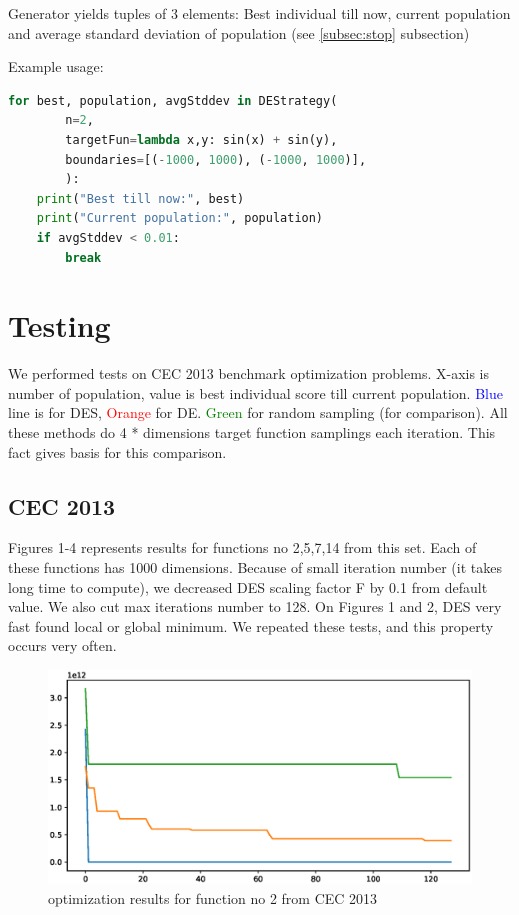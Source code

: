 \documentclass[11pt,a4paper]{article}
\begin{document}
Generator yields tuples of 3 elements:
Best individual till now, current population and average standard deviation of population (see \ref{subsec:stop} subsection)

Example usage:
\begin{lstlisting}[language=Python]
for best, population, avgStddev in DEStrategy(
        n=2,
        targetFun=lambda x,y: sin(x) + sin(y),
        boundaries=[(-1000, 1000), (-1000, 1000)],
        ):
    print("Best till now:", best)
    print("Current population:", population)
    if avgStddev < 0.01:
        break
\end{lstlisting}


\section{Testing}\label{sec:testing}
We performed tests on CEC 2013 benchmark optimization problems.
X-axis is number of population, value is best individual score till current population.
\textcolor{blue}{Blue} line is for DES, \textcolor{red}{Orange} for DE. \textcolor{green}{Green} for random sampling (for comparison).
All these methods do 4 * dimensions target function samplings each iteration.
This fact gives basis for this comparison.

\subsection{CEC 2013}\label{subsec:cec_testing}

Figures 1-4 represents results for functions no 2,5,7,14 from this set.
Each of these functions has 1000 dimensions.
Because of small iteration number (it takes long time to compute), we decreased DES scaling factor F by 0.1 from default value.
We also cut max iterations number to 128.
On Figures 1 and 2, DES very fast found local or global minimum. We repeated these tests, and this property occurs very often.

\begin{figure}[H]
	\centering
	\includegraphics[scale=0.6]{cec2013_1.eps}
	\caption{optimization results for function no 2 from CEC 2013}
\end{figure}
\end{document}
